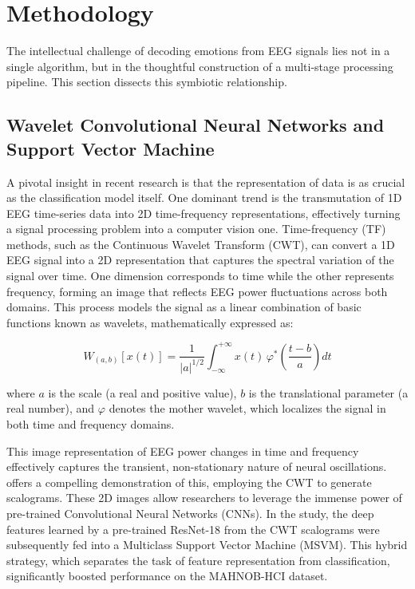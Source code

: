 \documentclass[conference]{IEEEtran}
\begin{document}
\section{Methodology}
The intellectual challenge of decoding emotions from EEG signals lies not in a single algorithm, but in the thoughtful construction of a multi-stage processing pipeline. This section dissects this symbiotic relationship.

\subsection{Wavelet Convolutional Neural Networks and Support Vector Machine}
A pivotal insight in recent research is that the representation of data is as crucial as the classification model itself. One dominant trend is the transmutation of 1D EEG time-series data into 2D time-frequency representations, effectively turning a signal processing problem into a computer vision one. Time-frequency (TF) methods, such as the Continuous Wavelet Transform (CWT), can convert a 1D EEG signal into a 2D representation that captures the spectral variation of the signal over time. One dimension corresponds to time while the other represents frequency, forming an image that reflects EEG power fluctuations across both domains. This process models the signal as a linear combination of basic functions known as wavelets, mathematically expressed as:

\begin{equation}
W_{(a,b)}[x(t)] = \frac{1}{|a|^{1/2}} \int_{-\infty}^{+\infty} x(t)\,\varphi^{*}\!\left(\frac{t - b}{a}\right) dt
\end{equation}

where \(a\) is the scale (a real and positive value), \(b\) is the translational parameter (a real number), and \(\varphi\) denotes the mother wavelet, which localizes the signal in both time and frequency domains.

This image representation of EEG power changes in time and frequency effectively captures the transient, non-stationary nature of neural oscillations. \cite{b1} offers a compelling demonstration of this, employing the CWT to generate scalograms. These 2D images allow researchers to leverage the immense power of pre-trained Convolutional Neural Networks (CNNs). In the study, the deep features learned by a pre-trained ResNet-18 from the CWT scalograms were subsequently fed into a Multiclass Support Vector Machine (MSVM). This hybrid strategy, which separates the task of feature representation from classification, significantly boosted performance on the MAHNOB-HCI dataset.
\end{document}

